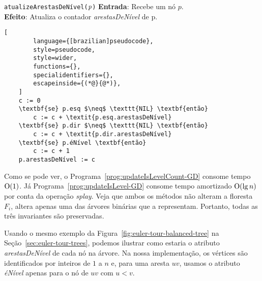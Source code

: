 \begin{programruledcaption}{\texttt{atualizeArestasDeNível($\emph{p}$)} \label{prog:updateIsLevelCount-GD}}
    \noindent\textbf{Entrada}: Recebe um nó $p$.\\
    \noindent\textbf{Efeito}: Atualiza o contador \textit{arestasDeNível} de p.
    \vspace{-0.5\baselineskip}
    \begin{lstlisting}[
        language={[brazilian]pseudocode},
        style=pseudocode,
        style=wider,
        functions={},
        specialidentifiers={},
        escapeinside={(*@}{@*)},
    ]
    c := 0
    \textbf{se} p.esq $\neq$ \texttt{NIL} \textbf{então}
        c := c + \textit{p.esq.arestasDeNível}
    \textbf{se} p.dir $\neq$ \texttt{NIL} \textbf{então}
        c := c + \textit{p.dir.arestasDeNível}
    \textbf{se} p.éNível \textbf{então}
        c := c + 1
    p.arestasDeNível := c
\end{lstlisting}
\vspace{-0.5\baselineskip}
\end{programruledcaption}


Como se pode ver, o Programa~\ref{prog:updateIsLevelCount-GD} consome tempo $\mathrm{O}(1)$. Já Programa~\ref{prog:updateIsLevel-GD} consome tempo amortizado $\mathrm{O}(\lg n)$ por conta da operação \textit{splay}. Veja que ambos os métodos não alteram a floresta $F_i$, altera apenas uma das árvores binárias que a representam. Portanto, todas as três invariantes são preservadas.

Usando o mesmo exemplo da Figura~\ref{fig:euler-tour-balanced-tree} na Seção~\ref{sec:euler-tour-trees}, podemos ilustrar como estaria o atributo \textit{arestasDeNível} de cada nó na árvore. Na nossa implementação, os vértices são identificados por inteiros de $1$ a $n$ e, para uma aresta $uv$, usamos o atributo \textit{éNível} apenas para o nó de $uv$ com $u < v$.

